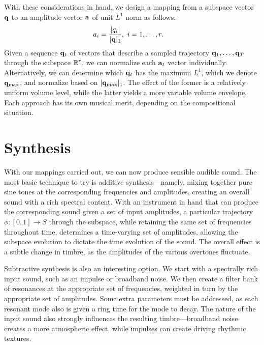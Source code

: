 \documentclass[11pt]{article}
\begin{document}
With these considerations in hand, we design a mapping from a subspace vector $\mathbf{q}$ to an amplitude vector $\mathbf{a}$ of unit $L^1$ norm as follows:
\begin{equation}
\begin{aligned}
a_i &= \frac{\lvert q_i \rvert}{\lvert\mathbf{q}\rvert_1}, \ i = 1, \ldots, r.
\end{aligned}
\end{equation}
Given a sequence ${\mathbf{q}_t}$ of vectors that describe a sampled trajectory $\mathbf{q}_1, \ldots, \mathbf{q}_T$ through the subspace $\mathbb{R}^r$, we can normalize each $\mathbf{a}_t$ vector individually. Alternatively, we can determine which $\mathbf{q}_t$ has the maximum $L^1$, which we denote ${\mathbf{q}}_\textnormal{max}$, and normalize based on $\lvert\mathbf{q}_{\textnormal{max}}\rvert_1$. The effect of the former is a relatively uniform volume level, while the latter yields a more variable volume envelope. Each approach has its own musical merit, depending on the compositional situation.


\section*{Synthesis}

With our mappings carried out, we can now produce sensible audible sound. The most basic technique to try is additive synthesis---namely, mixing together pure sine tones at the corresponding frequencies and amplitudes, creating an overall sound with a rich spectral content. With an instrument in hand that can produce the corresponding sound given a set of input amplitudes, a particular trajectory $\phi \colon [0, 1] \rightarrow S$ through the subspace, while retaining the same set of frequencies throughout time, determines a time-varying set of amplitudes, allowing the subspace evolution to dictate the time evolution of the sound. The overall effect is a subtle change in timbre, as the amplitudes of the various overtones fluctuate. 

Subtractive synthesis is also an interesting option. We start with a spectrally rich input sound, such as an impulse or broadband noise. We then create a filter bank of resonances at the appropriate set of frequencies, weighted in turn by the appropriate set of amplitudes. Some extra parameters must be addressed, as each resonant mode also is given a ring time for the mode to decay. The nature of the input sound also strongly influences the resulting timbre---broadband noise creates a more atmospheric effect, while impulses can create driving rhythmic textures. 
\end{document}
